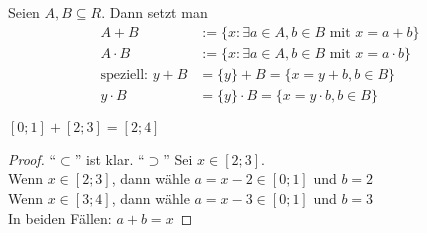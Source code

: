 \documentclass[12pt]{scrreprt}
\begin{document}
\begin{dfn*}
Seien $A,B \subseteq R$. Dann setzt man 
\begin{align*}
A + B &:= \{x:\exists a \in A, b\in B\text{ mit }x=a+b\}\\
A \cdot B &:= \{x:\exists a \in A, b\in B\text{ mit }x=a\cdot b\}\\
\text{speziell: }y+B&=\{y\}+B = \{x=y+b, b\in B\}\\
y\cdot B&=\{y\}\cdot B = \{x=y\cdot b, b\in B\}
\end{align*}
\end{dfn*}

\begin{bsp*}
$[0;1]+[2;3]=[2;4]$
\end{bsp*}
\begin{proof}
"`$\subset$"' ist klar.
"`$\supset$"' Sei $x \in [2;3]$.\\
Wenn $x \in [2;3]$, dann wähle $a=x-2\in[0;1]$ und $b=2$\\
Wenn $x \in [3;4]$, dann wähle $a=x-3\in[0;1]$ und $b=3$\\
In beiden Fällen: $a+b=x$
\end{proof}
\end{document}
